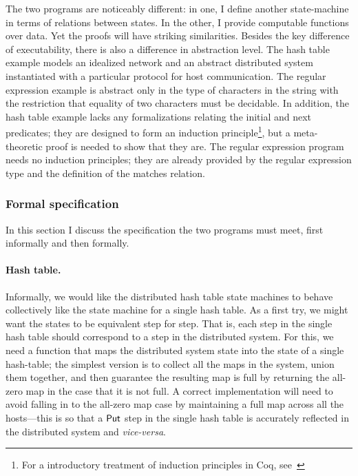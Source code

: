 The two programs are noticeably different: in one, I define another
state-machine in terms of relations between states. In the other, I provide
computable functions over data. Yet the proofs will have striking similarities.
Besides the key difference of executability, there is also a difference in
abstraction level. The hash table example models an idealized network and an
abstract distributed system instantiated with a particular protocol for host
communication. The regular expression example is abstract only in the type of
characters in the string with the restriction that equality of two characters
must be decidable. In addition, the hash table example lacks any formalizations
relating the initial and next predicates; they are designed to form an induction
principle\footnote{For a introductory treatment of induction principles in Coq,
see~\cite[Induction Principles]{Pierce:SF1}}, but a meta-theoretic proof is
needed to show that they are. The regular expression program needs no induction
principles; they are already provided by the regular expression type and the
definition of the matches relation.

\subsubsection{Formal specification}\label{S:ex_spec}

In this section I discuss the specification the two programs must meet, first
informally and then formally.

\paragraph{Hash table.} Informally, we would like the distributed hash table
state machines to behave collectively like the state machine for a single hash
table. As a first try, we might want the states to be equivalent step for step.
That is, each step in the single hash table should correspond to a step in the
distributed system. For this, we need a function that maps the distributed
system state into the state of a single hash-table; the simplest version is to
collect all the maps in the system, union them together, and then guarantee the
resulting map is full by returning the all-zero map in the case that it is not
full. A correct implementation will need to avoid falling in to the all-zero map
case by maintaining a full map across all the hosts---this is so that a
\(\mathsf{Put}\) step in the single hash table is accurately reflected in the
distributed system and \emph{vice-versa}.

